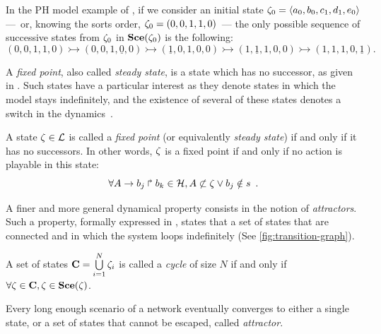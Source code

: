 \begin{example}
In the PH model example of , if we consider an initial state $\zeta_0 = \mbox{$\langle a_0, b_0, c_1, d_1, e_0 \rangle$}$ ---~or, knowing the sorts order, $\zeta_0 = (0, 0, 1, 1, 0)$~--- the only possible sequence of successive states from $\zeta_0$ in $\mathbf{Sce}(\zeta_0)$ is the following:
  \[(0, 0, 1, 1,0) \rightarrowtail (0, 0, 1, \underline{0}, 0) \rightarrowtail (\underline{1}, 0, 1, 0, 0) \rightarrowtail (1, \underline{1}, 1, 0, 0) \rightarrowtail (1, 1, 1, 0, \underline{1}).\]
\end{example}

A \emph{fixed point}, also called \emph{steady state},
is a state which has no successor,
as given in .
Such states have a particular interest as they denote states in which the model
stays indefinitely,
and the existence of several of these states denotes a switch in the dynamics~\cite{wuensche1998genomic}.

\begin{definition}
\label{def:fixpoint}
  A state $\zeta \in \mathcal{L}$ is called a \emph{fixed point}
  (or equivalently \emph{steady state})
  if and only if it has no successors.
  In other words, $\zeta$ is a fixed point if and only if no action is playable in this state:
$$ \forall A\rightarrow b_j\Rsh b_k \in \mathcal{H}, A \not\subset \zeta \vee b_j \notin s \enspace. $$
\end{definition}

A finer and more general dynamical property consists in
the notion of \emph{attractors}.
Such a property, formally expressed in ,
states that a set of states that are connected and in which the system loops indefinitely (See \ref{fig:transition-graph}).


\begin{definition}
\label{def:cycle}
A set of states $\mathbf{C} = \bigcup\limits_{i=1}^{N} \zeta_{i}$ is called a \emph{cycle} of size $N$ if and only if $\forall \zeta \in \mathbf{C}, \zeta \in \mathbf{Sce}(\zeta) $.
\end{definition}

Every long enough scenario of a network eventually converges to either a single state, or a set of states that cannot be escaped, called \emph{attractor}.

